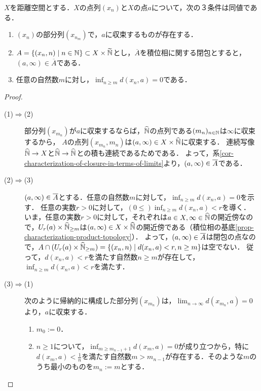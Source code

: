 \documentclass[uplatex,dvipdfmx]{jsreport}
\begin{document}
\begin{lemma}[部分列が収束することの特徴付け]\label{lemma-部分列が収束することの特徴付け}
    $X$を距離空間とする．$X$の点列$(x_n)$と$X$の点$a$について，次の３条件は同値である．
    \begin{enumerate}
        \item $(x_n)$の部分列$(x_{n_m})$で，$a$に収束するものが存在する．
        \item $A=\{(x_n,n)\mid n\in\mathbb{N}\}\subset X\times\widetilde{\mathbb{N}}$とし，$\overline{A}$を積位相に関する閉包とすると，$(a,\infty)\in\overline{A}$である．
        \item 任意の自然数$m$に対し，$\inf_{n\ge m}d(x_n,a)=0$である．
    \end{enumerate}
\end{lemma}
\begin{proof}\mbox{}
    \begin{description}
        \item[(1)$\Rightarrow$(2)] 
        部分列$(x_{m_n})$が$a$に収束するならば，$\widehat{\mathbb{N}}$の点列である$(m_n)_{n\in\mathbb{N}}$は$\infty$に収束するから，
        $A$の点列$(x_{m_n},m_n)$は$(a,\infty)\in X\times\widehat{\mathbb{N}}$に収束する．
        連続写像$\widehat{\mathbb{N}}\to X$と$\widehat{\mathbb{N}}\to\widehat{\mathbb{N}}$との積も連続であるためである．
        よって，系\ref{cor-characterization-of-closure-in-terms-of-limits}より，$(a,\infty)\in\overline{A}$である．
        \item[(2)$\Rightarrow$(3)]
        $(a,\infty)\in\overline{A}$とする．任意の自然数$m$に対して，$\inf_{n\ge m}d(x_n,a)=0$を示す．
        任意の実数$r>0$に対して，$(0\le)\inf_{n\ge m}d(x_n,a)<r$を導く．
        いま，任意の実数$r>0$に対して，それぞれは$a\in X,\infty\in\widehat{\mathbb{N}}$の開近傍なので，$U_r(a)\times\widehat{\mathbb{N}}_{\ge m}$は$(a,\infty)\in X\times\widehat{\mathbb{N}}$の開近傍である（積位相の基底\ref{prop-characterization-product-topology}）．
        よって，$(a,\infty)\in\overline{A}$は閉包の点なので，$A\cap(U_r(a)\times\widehat{\mathbb{N}}_{\ge m})=\{(x_n,n)\mid d(x_n,a)<r,n\ge m\}$は空でない．
        従って，$d(x_n,a)<r$を満たす自然数$n\ge m$が存在して，$\inf_{n\ge m}d(x_n,a)<r$を満たす．
        \item[(3)$\Rightarrow$(1)]
        次のように帰納的に構成した部分列$(x_{m_n})$は，$\lim_{n\to\infty}d(x_{m_n},a)=0$より，$a$に収束する．
        \begin{enumerate}
            \item $m_0:=0$．
            \item $n\ge 1$について，$\inf_{m\ge m_{n-1}+1}d(x_m,a)=0$が成り立つから，特に$d(x_m,a)<\frac{1}{n}$を満たす自然数$m>m_{n-1}$が存在する．そのような$m$のうち最小のものを$m_n:=m$とする．
        \end{enumerate}
    \end{description}
\end{proof}
\end{document}
